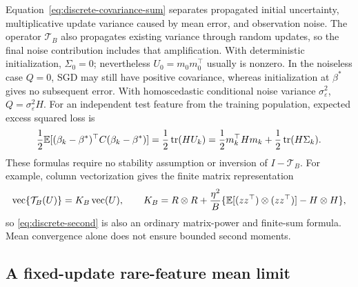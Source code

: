 Equation~\eqref{eq:discrete-covariance-sum} separates propagated initial
uncertainty, multiplicative update variance caused by mean error, and
observation noise. The operator $\mathcal T_B$ also propagates existing variance
through random updates, so the final noise contribution includes that
amplification. With deterministic initialization, $\Sigma_0 = 0$; nevertheless
$U_0 = m_0m_0^\top$ usually is nonzero. In the noiseless case $Q = 0$, SGD may
still have positive covariance, whereas initialization at $\beta^*$ gives no
subsequent error. With homoscedastic conditional noise variance
$\sigma_\varepsilon^2$, $Q = \sigma_\varepsilon^2H$. For an independent test
feature from the training population, expected excess squared loss is
\[
 \frac12\mathbb{E}[(\beta_k-\beta^*)^\top C(\beta_k-\beta^*)]
 = \frac12\operatorname{tr}(HU_k)
 = \frac12m_k^\top Hm_k + \frac12\operatorname{tr}(H\Sigma_k).
\]
These formulas require no stability assumption or inversion of
$I - \mathcal T_B$. For example, column vectorization gives the finite matrix
representation
\[
 \operatorname{vec}\{\mathcal T_B(U)\}
 = K_B\operatorname{vec}(U),\qquad K_B
 = R
   \otimes R
   + \frac{\eta^2}{B} \{\mathbb{E}[(zz^\top)\otimes(zz^\top)] - H \otimes H\},
\]
so \eqref{eq:discrete-second} is also an ordinary matrix-power and finite-sum
formula. Mean convergence alone does not ensure bounded second moments.

\subsection{A fixed-update rare-feature mean limit}

